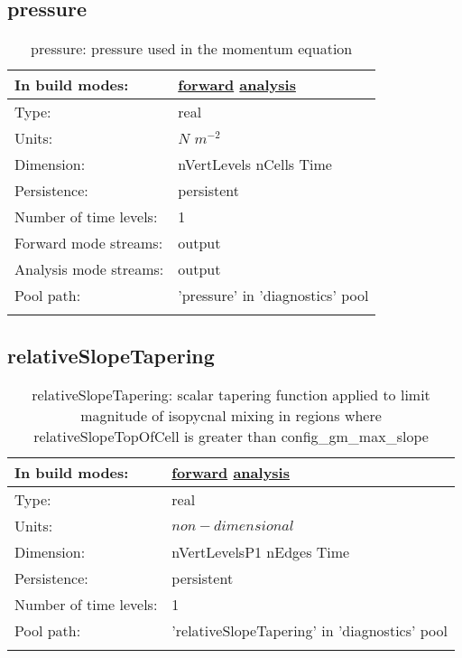 \subsection[pressure]{pressure}
\label{subsec:var_sec_diagnostics_pressure}
\begin{center}
\begin{longtable}{| p{2.0in} | p{4.0in} |}
        \hline 
        In build modes: & \hyperref[subsec:forward_var_tab_diagnostics]{forward} \hyperref[subsec:analysis_var_tab_diagnostics]{analysis} \\
        \hline 
        Type: & real \\
        \hline 
        Units: & $N$ $m^{-2}$ \\
        \hline 
        Dimension: & nVertLevels nCells Time \\
        \hline 
        Persistence: & persistent \\
        \hline 
        Number of time levels: & 1 \\
        \hline 
		 Forward mode streams: &  output \\
        \hline 
		 Analysis mode streams: &  output \\
        \hline 
            Pool path: & 'pressure' in 'diagnostics' pool
 \\
		 \hline 
    \caption{pressure: pressure used in the momentum equation}
\end{longtable}
\end{center}
\subsection[relativeSlopeTapering]{relativeSlopeTapering}
\label{subsec:var_sec_diagnostics_relativeSlopeTapering}
\begin{center}
\begin{longtable}{| p{2.0in} | p{4.0in} |}
        \hline 
        In build modes: & \hyperref[subsec:forward_var_tab_diagnostics]{forward} \hyperref[subsec:analysis_var_tab_diagnostics]{analysis} \\
        \hline 
        Type: & real \\
        \hline 
        Units: & $non-dimensional$ \\
        \hline 
        Dimension: & nVertLevelsP1 nEdges Time \\
        \hline 
        Persistence: & persistent \\
        \hline 
        Number of time levels: & 1 \\
        \hline 
            Pool path: & 'relativeSlopeTapering' in 'diagnostics' pool
 \\
		 \hline 
    \caption{relativeSlopeTapering: scalar tapering function applied to limit magnitude of isopycnal mixing in regions where relativeSlopeTopOfCell is greater than config\_gm\_max\_slope}
\end{longtable}
\end{center}
